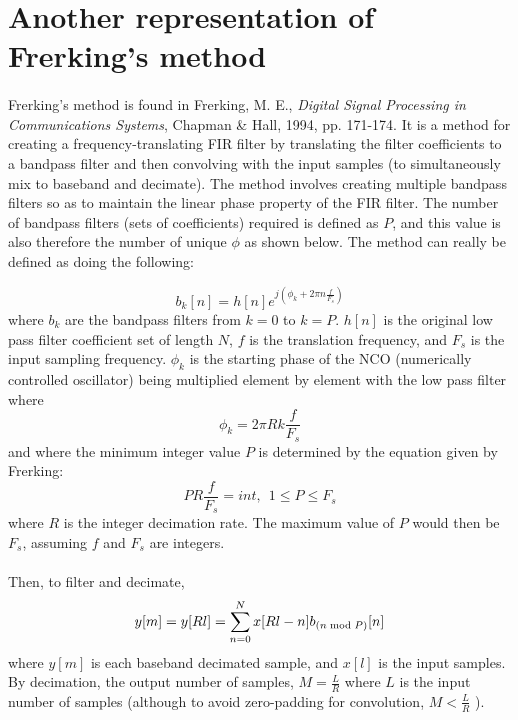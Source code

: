 \documentclass{article}
\begin{document}
    \section{Another representation of Frerking's method}
        \paragraph{} 
        Frerking's method is found in Frerking, M. E., \textit{Digital Signal Processing in Communications Systems}, Chapman \& Hall, 1994, pp. 171-174. It is a method for creating a frequency-translating FIR filter by translating the filter coefficients to a bandpass filter and then convolving with the input samples (to simultaneously mix to baseband and decimate). The method involves creating multiple bandpass filters so as to maintain the linear phase property of the FIR filter. The number of bandpass filters (sets of coefficients) required is defined as $P$, and this value is also therefore the number of unique ${\phi}$ as shown below. The method can really be defined as doing the following:
        
        \begin{equation} \label{eq1}
            {{b}_k[n]} = h[n]e^{j({\phi}_k + 2{\pi}n\frac{f}{{F}_s})}
        \end{equation}
        where ${b}_k$ are the bandpass filters from $k=0$ to $k=P$. ${h[n]}$ is the original low pass filter coefficient set of length $N$, $f$ is the translation frequency, and ${F}_s$ is the input sampling frequency. ${{\phi}_k}$ is the starting phase of the NCO (numerically controlled oscillator) being multiplied element by element with the low pass filter where 
        \begin{equation}
            {\phi}_k = 2{\pi}Rk{\frac{f}{{F}_s}}
        \end{equation}
        and where the minimum integer value $P$ is determined by the equation given by Frerking:
        \begin{equation}
            PR\frac{f}{{F}_s} = int,\ \ 1 \leq P \leq {F}_s
        \end{equation}
        where $R$ is the integer decimation rate. The maximum value of $P$ would then be ${F}_s$, assuming $f$ and ${F}_s$ are integers.
        \paragraph{}
        Then, to filter and decimate,
        \begin{equation}
            {y[m]} = {y[Rl]} = \sum\limits_{n=0}^N x[Rl-n]{b}_{(n{\bmod}P)}[n]
        \end{equation}
        where ${y[m]}$ is each baseband decimated sample,  and ${x[l]}$ is the input samples. By decimation, the output number of samples, $M = \frac{L}{R}$ where $L$ is the input number of samples (although to avoid zero-padding for convolution, $M< {\frac{L}{R}}$ ).
        
\end{document}
